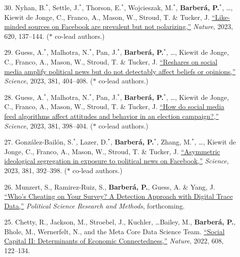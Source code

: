 \documentclass[margin,line,11pt]{resume}
\begin{document}
\begin{resume}
\begin{itemize}[leftmargin=5.5mm]
\item[30.] Nyhan, B.$^\ast$, Settle, J.$^\ast$, Thorson, E.$^\ast$, Wojcieszak, M.$^\ast$,  \textbf{Barber\'{a}, P.$^\ast$}, \ldots, Kiewit de Jonge, C., Franco, A., Mason, W., Stroud, T. \& Tucker, J. \href{https://www.nature.com/articles/s41586-023-06297-w}{``Like-minded sources on Facebook are prevalent but not polarizing,''} \textit{Nature}, 2023, 620, 137--144.  ($\ast$ co-lead authors.)

\item[29.] Guess, A.$^\ast$, Malhotra, N.$^\ast$, Pan, J.$^\ast$, \textbf{Barber\'{a}, P.$^\ast$}, \ldots, Kiewit de Jonge, C., Franco, A., Mason, W., Stroud, T. \& Tucker, J. \href{https://www.science.org/doi/10.1126/science.add8424}{``Reshares on social media amplify political news but do not detectably affect beliefs or opinions,''} \textit{Science}, 2023, 381, 404--408.  ($\ast$ co-lead authors.)

\item[28.] Guess, A.$^\ast$, Malhotra, N.$^\ast$, Pan, J.$^\ast$, \textbf{Barber\'{a}, P.$^\ast$}, \ldots, Kiewit de Jonge, C., Franco, A., Mason, W., Stroud, T. \& Tucker, J. \href{https://www.science.org/doi/10.1126/science.abp9364}{``How do social media feed algorithms affect attitudes and behavior in an election campaign?,''} \textit{Science}, 2023, 381, 398--404. ($\ast$ co-lead authors.)

\item[27.] Gonz\'{a}lez-Bail\'{o}n, S.$^\ast$, Lazer, D.$^\ast$,  \textbf{Barber\'{a}, P.$^\ast$}, Zhang, M.$^\ast$, \ldots, Kiewit de Jonge, C., Franco, A., Mason, W., Stroud, T. \& Tucker, J. \href{https://www.science.org/doi/10.1126/science.ade7138}{``Asymmetric ideological segregation in exposure to political news on Facebook,''} \textit{Science}, 2023, 381, 392--398. ($\ast$ co-lead authors.)

\newpage  

\item[26.] Munzert, S., Ramirez-Ruiz, S., \textbf{Barber\'{a}, P.}, Guess, A. \& Yang, J. \href{https://www.cambridge.org/core/journals/political-science-research-and-methods/article/abs/whos-cheating-on-your-survey-a-detection-approach-with-digital-trace-data/115692ADAE92807490B3E02FDA306598}{``Who's Cheating on Your Survey? A Detection Approach with Digital Trace Data,''} \textit{Political Science Research and Methods}, forthcoming.

\item[25.] Chetty, R., Jackson, M., Stroebel, J., Kuchler, \ldots Bailey, M., \textbf{Barber\'{a}, P.}, Bhole, M., Wernerfelt, N., and the Meta Core Data Science Team. \href{https://www.nature.com/articles/s41586-022-04997-3}{``Social Capital II: Determinants of Economic Connectedness,''} \textit{Nature}, 2022, 608, 122--134.


\end{itemize}
\end{resume}
\end{document}
